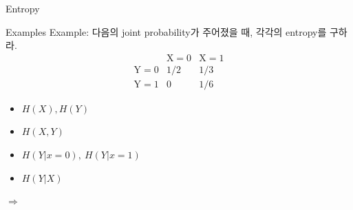 \documentclass[9pt]{beamer}
\begin{document}
\begin{section}{Entropy}
        \begin{frame}{Examples}
            Example: 다음의 joint probability가 주어졌을 때, 각각의 entropy를 구하라.
            $$ \begin{array}{c|cc}  & \mathrm{X}=0 & \mathrm{X}=1 \\ \hline \mathrm{Y}=0 & 1 / 2 & 1 / 3 \\ \mathrm{Y}=1 & 0 & 1 / 6 \end{array}$$
            \begin{itemize}
                \item $H(X), H(Y)$
                \item $H(X,Y)$
                \item $H(Y|x=0),\ H(Y|x=1)$
                \item $H(Y|X)$
            \end{itemize}
            $\Rightarrow$
            \vspace{3cm}
        \end{frame}
    \end{section}
\end{document}
